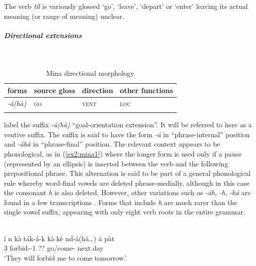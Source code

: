 The verb \textit{tíl} is variously glossed `go', `leave', `depart' or `enter' leaving its actual meaning (or range of meaning) unclear. 

\subparagraph{Directional extensions}~

\begin{table}[H]
\caption{Mina directional morphology}
\label{tab:mina}
\begin{tabular}{llll} %
	\lsptoprule
	forms & source gloss & direction  & other functions  \\ %
	\midrule
	\textit{-á(hà)}  &  \textsc{go}  &   \textsc{vent} &   \textsc{loc}  \\
	\lspbottomrule
\end{tabular}
\end{table} 

\citet[171]{frajzyngierGrammarMina2005} label the suffix \textit{-á(hà)} ``goal-orientation extension''. It will be referred to here as a ventive suffix. The suffix is said to have the form \textit{-á} in ``phrase-internal'' position and \textit{-áhà} in ``phrase-final'' position. The relevant context appears to be phonological, as in (\ref{ex2:mina1}) where the longer form is used only if a pause (represented by an ellipsis) is inserted between the verb and the following prepositional phrase. This alternation is said to be part of a general phonological rule whereby word-final vowels are deleted phrase-medially, although in this case the consonant \textit{h} is also deleted. However, other variations such as \textit{-áh}, \textit{-h}, \textit{-há} are found in a few transcriptions \citep[112, 316, 341]{frajzyngierGrammarMina2005}. Forms that include \textit{h} are much rarer than the single vowel suffix, appearing with only eight verb roots in the entire grammar.

\ea\label{ex2:mina1}
 \\
\gll í	n	kə̀ ták-á-k	kə̀ kè	nd-á(hà…)	á	pàt \\
3			forbid--1	??		go/come-	 next.day \\
\glt `They will forbid me to come tomorrow.'
\z 

